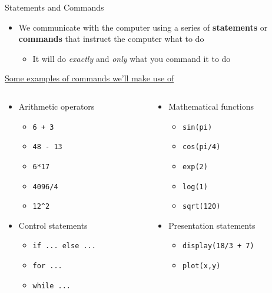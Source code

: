 {}\documentclass[letterpaper,
compress,
xcolor=x11names,
]{beamer}
\begin{document}
\begin{frame}{Statements and Commands}
	\footnotesize
	\begin{itemize}
		\item We communicate with the computer using a series of \textbf{statements} or \textbf{commands} that instruct the computer what to do
		\begin{itemize}
			\item It will do \textit{exactly} and \textit{only} what you command it to do 
		\end{itemize}
	\end{itemize}
	\vspace{0.5cm}
	\underline{Some examples of commands we'll make use of}
	\begin{columns}
		\begin{column}{0.45\linewidth}
			\begin{itemize}
				\item Arithmetic operators
				\begin{itemize}
					\item \texttt{6 + 3}
					\item \texttt{48 - 13}
					\item \texttt{6*17}
					\item \texttt{4096/4}
					\item \texttt{12\^{}2}
				\end{itemize}
				\item Control statements
				\begin{itemize}
					\item \texttt{if ... else ...}
					\item \texttt{for ...}
					\item \texttt{while ...}
				\end{itemize}
				
			\end{itemize}
		\end{column}
		\begin{column}{0.45\linewidth}
			\begin{itemize}
				\item Mathematical functions 
				\begin{itemize}
					\item \texttt{sin(pi)}
					\item \texttt{cos(pi/4)}
					\item \texttt{exp(2)}
					\item \texttt{log(1)}
					\item \texttt{sqrt(120)}
				\end{itemize}
				\item Presentation statements 
				\begin{itemize}
					\item \texttt{display(18/3 + 7)}
					\item \texttt{plot(x,y)}
				\end{itemize}
			\end{itemize}
		\end{column}
	\end{columns}
\end{frame}
\end{document}
